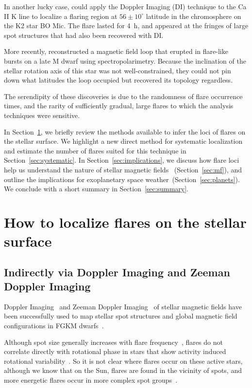 \documentclass[proof]{WileyASNA-v1}
\newcommand{\jdag}[1]{\textcolor{darkred}{#1}}
\begin{document}
In another lucky case, \citet{wolter2008} could apply the Doppler Imaging (DI) technique to the Ca II K line to localize a flaring region at $56\pm10^\circ$ latitude in the chromosphere on the K2 star BO Mic. The flare lasted for 4~h, and appeared at the fringes of large spot structures that had also been recovered with DI.

More recently, \citet{berdyugina2017} reconstructed a magnetic field loop that erupted in flare-like bursts on a late M dwarf using spectropolarimetry. Because the inclination of the stellar rotation axis of this star was not well-constrained, they could not pin down what latitudes the loop occupied but recovered its topology regardless.

The serendipity of these discoveries is due to the randomness of flare occurrence times, and the rarity of sufficiently gradual, large flares to which the analysis techniques were sensitive. 

In Section~\ref{sec:howto}, we briefly review the methods available to infer the loci of flares on the stellar surface. We highlight a new direct method for systematic localization and estimate the number of flares suited for this technique in Section~\ref{sec:systematic}. In Section~\ref{sec:implications}, we discuss how flare loci help us understand the nature of stellar magnetic fields ~(Section~\ref{sec:mf}), and outline the implications for exoplanetary space weather~(Section~\ref{sec:planets}). We conclude with a short summary in Section~\ref{sec:summary}.

\section{How to localize flares on the stellar surface}
\label{sec:howto}

\subsection{Indirectly via Doppler Imaging and Zeeman Doppler Imaging }
Doppler Imaging~\citep[DI,][]{deutsch1958, goncharskii1977} and Zeeman Doppler Imaging~\citep[ZDI,][]{semel1989, donati1989} of stellar magnetic fields have been successfully used to map stellar spot structures and global magnetic field configurations in FGKM dwarfs~\citep{strassmeier2002,morin2008,morin2010,see2019}. %

Although spot size generally increases with flare frequency~\citep{maehara2017}, flares do not correlate directly with rotational phase in stars that show activity induced rotational variability~\citep[i.e., dark spots or bright regions,][]{ramsay2013,doyle2019}. So it is not clear where flares occur on these active stars, although we know that on the Sun, flares are found in the vicinity of spots, and more energetic flares occur in more complex spot groups~\citep{sammis2000}. %
\end{document}
